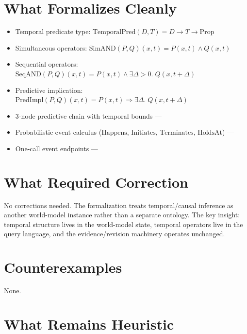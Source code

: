 \documentclass[11pt,openany]{report}
\begin{document}
\section{What Formalizes Cleanly}

\begin{itemize}
\item Temporal predicate type: $\mathrm{TemporalPred}(D, T) = D \to T \to \mathrm{Prop}$
\item Simultaneous operators: $\mathrm{SimAND}(P, Q)(x, t) = P(x,t) \wedge Q(x,t)$
\item Sequential operators:
  $\mathrm{SeqAND}(P, Q)(x, t) = P(x, t) \wedge \exists \Delta > 0.\; Q(x, t + \Delta)$
\item Predictive implication:
  $\mathrm{PredImpl}(P, Q)(x, t) = P(x, t) \Rightarrow \exists \Delta.\; Q(x, t + \Delta)$
\item 3-node predictive chain with temporal bounds ---
\item Probabilistic event calculus ($\mathrm{Happens}$, $\mathrm{Initiates}$,
  $\mathrm{Terminates}$, $\mathrm{HoldsAt}$) ---
\item One-call event endpoints ---
\end{itemize}

\section{What Required Correction}

No corrections needed.  The formalization treats temporal/causal
inference as another world-model instance rather than a separate
ontology.  The key insight: temporal structure lives in the
world-model state, temporal operators live in the query language,
and the evidence/revision machinery operates unchanged.

\section{Counterexamples}

None.

\section{What Remains Heuristic}
\end{document}
